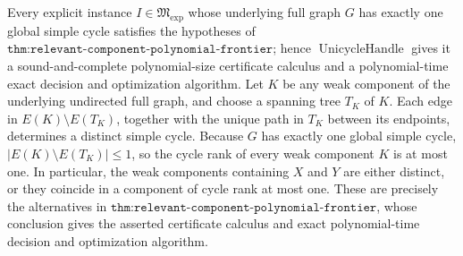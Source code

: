 Every explicit instance \(I\in\mathfrak M_{\mathrm{exp}}\) whose underlying full graph \(G\) has exactly one global simple cycle satisfies the hypotheses of \(\texttt{thm:relevant-component-polynomial-frontier}\); hence \(\operatorname{UnicycleHandle}\) gives it a sound-and-complete polynomial-size certificate calculus and a polynomial-time exact decision and optimization algorithm.
Let \(K\) be any weak component of the underlying undirected full graph, and choose a spanning tree \(T_K\) of \(K\).  Each edge in \(E(K)\setminus E(T_K)\), together with the unique path in \(T_K\) between its endpoints, determines a distinct simple cycle.  Because \(G\) has exactly one global simple cycle, \(|E(K)\setminus E(T_K)|\le 1\), so the cycle rank of every weak component \(K\) is at most one.  In particular, the weak components containing \(X\) and \(Y\) are either distinct, or they coincide in a component of cycle rank at most one.  These are precisely the alternatives in \(\texttt{thm:relevant-component-polynomial-frontier}\), whose conclusion gives the asserted certificate calculus and exact polynomial-time decision and optimization algorithm.
